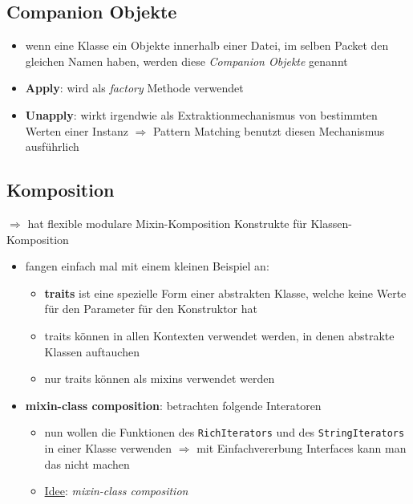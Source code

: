 \subsection{Companion Objekte}
\begin{itemize}
  \item wenn eine Klasse \und ein Objekte innerhalb einer Datei, im selben
  Packet den gleichen Namen haben, werden diese \textit{Companion Objekte}
  genannt
  \item \textbf{Apply}: wird als \textit{factory} Methode verwendet
  
  
  
  \item \textbf{Unapply}: wirkt irgendwie als Extraktionmechanismus von
  bestimmten Werten einer Instanz $\Rightarrow$ Pattern Matching
  benutzt diesen Mechanismus ausführlich
  
  
\end{itemize}


\subsection{Komposition}
$\Rightarrow$ hat flexible modulare Mixin-Komposition Konstrukte für 
Klassen-Komposition


\begin{itemize}
  \item fangen einfach mal mit einem kleinen Beispiel an:
  
  
  
  \begin{itemize}
    \item \textbf{traits} ist eine spezielle Form einer abstrakten Klasse, welche
    keine Werte für den Parameter für den Konstruktor hat
    \item traits können in allen Kontexten verwendet werden, in denen abstrakte
    Klassen auftauchen
    \item nur traits können als mixins verwendet werden
  \end{itemize}
  
  \item \textbf{mixin-class composition}: betrachten folgende Interatoren
  
  
  
  \begin{itemize}
    \item nun wollen die Funktionen des \texttt{RichIterators} und des
    \texttt{StringIterators} in einer Klasse verwenden $\Rightarrow$ mit
    Einfachvererbung \und Interfaces kann man das nicht machen
    \item \uline{Idee}: \textit{mixin-class composition}
    
    
    
  \end{itemize}
\end{itemize}


